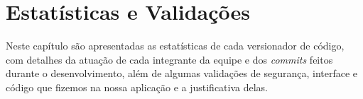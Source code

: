 \chapter{Estatísticas e Validações}
Neste capítulo são apresentadas as estatísticas de cada versionador de código, com detalhes da atuação de cada integrante da equipe e dos \textit{commits} feitos durante o desenvolvimento, além de algumas validações de segurança, interface e código que fizemos na nossa aplicação e a justificativa delas.


